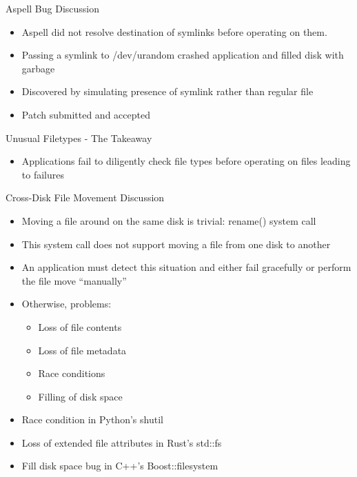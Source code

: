 \documentclass[pdf]{beamer}
\begin{document}
\begin{frame}{Aspell Bug Discussion}
  \begin{itemize}
    \item{Aspell did not resolve destination of symlinks before operating
      on them.}
    \item{Passing a symlink to /dev/urandom crashed application and filled
      disk with garbage}
    \item{Discovered by simulating presence of symlink rather than regular
      file}
    \item{Patch submitted and accepted}
  \end{itemize}
\end{frame}


\begin{frame}{Unusual Filetypes - The Takeaway}
  \begin{itemize}
    \item{Applications fail to diligently check file types before operating
      on files leading to failures}
  \end{itemize}
\end{frame}


\begin{frame}{Cross-Disk File Movement Discussion}
  \begin{itemize}
    \item{Moving a file around on the same disk is trivial: rename() system
      call}
    \item{This system call does not support moving a file from one disk to
      another}
    \item{An application must detect this situation and either fail
      gracefully or perform the file move ``manually''}
    \item{Otherwise, problems:}
      \begin{itemize}
        \item{Loss of file contents}
        \item{Loss of file metadata}
        \item{Race conditions}
        \item{Filling of disk space}
      \end{itemize}
    \item{Race condition in Python's shutil}
    \item{Loss of extended file attributes in Rust's std::fs}
    \item{Fill disk space bug in C++'s Boost::filesystem}
  \end{itemize}
\end{frame}
\end{document}
